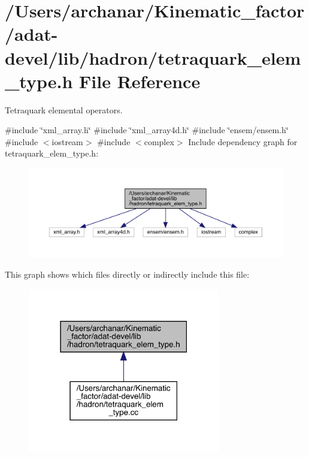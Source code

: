 \hypertarget{adat-devel_2lib_2hadron_2tetraquark__elem__type_8h}{}\section{/\+Users/archanar/\+Kinematic\+\_\+factor/adat-\/devel/lib/hadron/tetraquark\+\_\+elem\+\_\+type.h File Reference}
\label{adat-devel_2lib_2hadron_2tetraquark__elem__type_8h}


Tetraquark elemental operators.  


{\ttfamily \#include \char`\"{}xml\+\_\+array.\+h\char`\"{}}\newline
{\ttfamily \#include \char`\"{}xml\+\_\+array4d.\+h\char`\"{}}\newline
{\ttfamily \#include \char`\"{}ensem/ensem.\+h\char`\"{}}\newline
{\ttfamily \#include $<$iostream$>$}\newline
{\ttfamily \#include $<$complex$>$}\newline
Include dependency graph for tetraquark\+\_\+elem\+\_\+type.\+h\+:
\nopagebreak
\begin{figure}[H]
\begin{center}
\leavevmode
\includegraphics[width=350pt]{dc/d5b/adat-devel_2lib_2hadron_2tetraquark__elem__type_8h__incl}
\end{center}
\end{figure}
This graph shows which files directly or indirectly include this file\+:
\nopagebreak
\begin{figure}[H]
\begin{center}
\leavevmode
\includegraphics[width=238pt]{df/d8d/adat-devel_2lib_2hadron_2tetraquark__elem__type_8h__dep__incl}
\end{center}
\end{figure}
